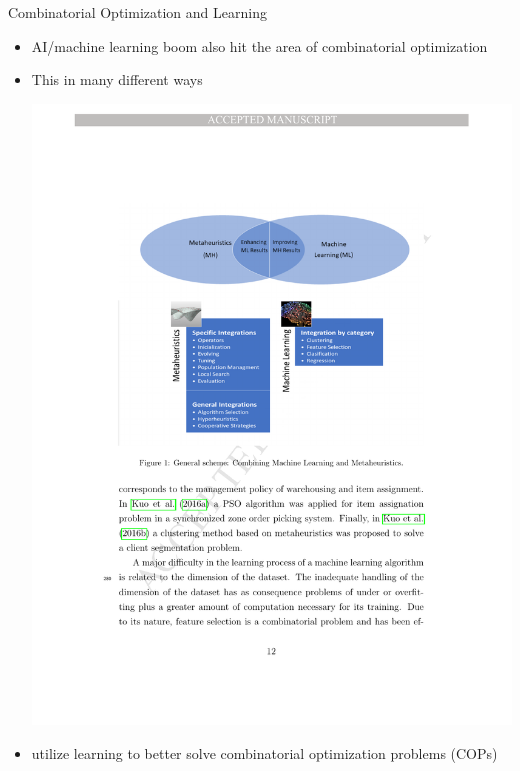 \documentclass[aspectratio=1610]{beamer}
\newcommand{\important}[1]{{\color{green!60!black}#1}}
\begin{document}
\begin{frame}{Combinatorial Optimization and Learning}
	\begin{itemize}
		\itemsep2.5ex
		\item \important{AI/machine learning boom} also hit the area of \important{combinatorial optimization}
		\item This in many different ways
		\begin{center}
			\centering
			\includegraphics[width=0.85\linewidth]{figures/mh-ml}
		\end{center}
		\item {} utilize learning to better solve \important{combinatorial optimization problems (COPs)}
	\end{itemize}
\end{frame}
\end{document}
